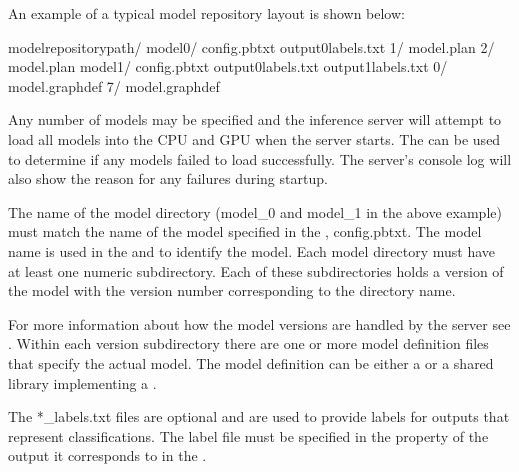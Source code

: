 \documentclass[letterpaper,10pt,english]{sphinxmanual}
\begin{document}
An example of a typical model repository layout is shown below:

\begin{sphinxVerbatim}[commandchars=\\\{\}]
\PYGZlt{}model\PYGZhy{}repository\PYGZhy{}path\PYGZgt{}/
  model\PYGZus{}0/
    config.pbtxt
    output0\PYGZus{}labels.txt
    1/
      model.plan
    2/
      model.plan
  model\PYGZus{}1/
    config.pbtxt
    output0\PYGZus{}labels.txt
    output1\PYGZus{}labels.txt
    0/
      model.graphdef
    7/
      model.graphdef
\end{sphinxVerbatim}

Any number of models may be specified and the inference server will
attempt to load all models into the CPU and GPU when the server
starts. The {\hyperref[\detokenize{http_grpc_api:section-api-status}]{}} can be used to
determine if any models failed to load successfully. The server’s
console log will also show the reason for any failures during startup.

The name of the model directory (model\_0 and model\_1 in the above
example) must match the name of the model specified in the
{\hyperref[\detokenize{model_configuration:section-model-configuration}]{}},
config.pbtxt. The model name is used in the {\hyperref[\detokenize{client:section-client-api}]{}} and {\hyperref[\detokenize{http_grpc_api:section-inference-server-api}]{}} to identify the model. Each model
directory must have at least one numeric subdirectory. Each of these
subdirectories holds a version of the model with the version number
corresponding to the directory name.

For more information about how the model versions are handled by the
server see {\hyperref[\detokenize{model_repository:section-model-versions}]{}}.  Within each version
subdirectory there are one or more model definition files that specify
the actual model. The model definition can be either a
{\hyperref[\detokenize{model_repository:section-framework-model-definition}]{}} or a shared library implementing
a {\hyperref[\detokenize{model_repository:section-custom-backends}]{}}.

The *\_labels.txt files are optional and are used to provide labels for
outputs that represent classifications. The label file must be
specified in the  property of
the output it corresponds to in the {\hyperref[\detokenize{model_configuration:section-model-configuration}]{}}.
\end{document}
